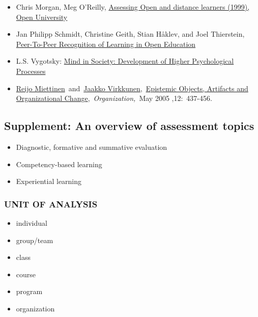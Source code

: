 \begin{itemize}
\item
  Chris Morgan, Meg O'Reilly,
  \href{http://books.google.com/books/about/Assessing\_Open\_and\_Distance\_Learners.html?id=wZcihyWRdIIC}{Assessing
  Open and distance learners (1999), Open University}
\item
  Jan Philipp Schmidt, Christine Geith, Stian Håklev, and Joel
  Thierstein,
  \href{http://www.irrodl.org/index.php/irrodl/article/view/641/1389}{Peer-To-Peer
  Recognition of Learning in Open Education}
\item
  L.S. Vygotsky:
  \href{http://books.google.com/books?id=RxjjUefze\_oC\&printsec=frontcover\&source=gbs\_atb\#v=onepage\&q\&f=false}{Mind
  in Society: Development of Higher Psychological Processes}
\item
  \href{http://org.sagepub.com/search?author1=Reijo+Miettinen\&sortspec=date\&submit=Submit}{Reijo
  Miettinen}~and~\href{http://org.sagepub.com/search?author1=Jaakko+Virkkunen\&sortspec=date\&submit=Submit}{Jaakko
  Virkkunen},~\href{http://org.sagepub.com/content/12/3/437.abstract}{Epistemic
  Objects, Artifacts and Organizational
  Change},~\emph{Organization,}~May 2005 ,12:~437-456.
\end{itemize}

\subsection{Supplement: An overview of assessment topics}

\begin{itemize}
\item
  Diagnostic, formative and summative evaluation
\item
  Competency-based learning
\item
  Experiential learning
\end{itemize}

\subsubsection{UNIT OF ANALYSIS}

\begin{itemize}
\item
  individual
\item
  group/team
\item
  class
\item
  course
\item
  program
\item
  organization
\end{itemize}

